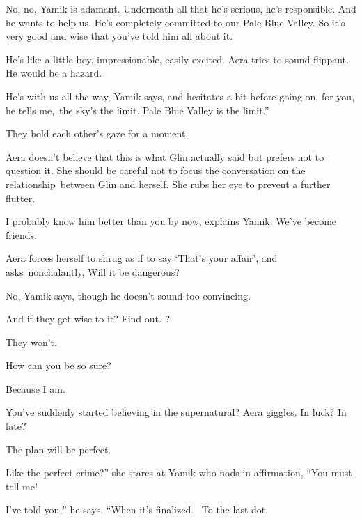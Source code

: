 \documentclass[letterpaper]{article}
\begin{document}
{\textquotedbl}No, no,{\textquotedbl} Yamik is adamant. {\textquotedbl}Underneath all that he's serious, he's
responsible. And he wants to help us. He's completely committed to our Pale Blue Valley. So it's very good and wise
that you've told him all about it.{\textquotedbl} 

{\textquotedbl}He's like a little boy, impressionable, easily excited.{\textquotedbl} Aera tries to sound flippant.
{\textquotedbl}He would be a hazard.{\textquotedbl}

{\textquotedbl}He's with us all the way,{\textquotedbl} Yamik says, and hesitates a bit before going on,\textcolor{red}{
}{\textquotedbl}for you, he tells me,~the sky's the limit. Pale Blue Valley is the limit.''

They hold each other's gaze for a moment.

Aera doesn't believe that this is what Glin actually said but prefers not to question it. She should be careful not to
focus the conversation on the relationship~between Glin and herself. She rubs her eye to prevent a further flutter.

{\textquotedbl}I probably know him better than you by now,{\textquotedbl} explains Yamik. {\textquotedbl}We've become
friends.{\textquotedbl} 

Aera forces herself to shrug as if to say `That's your affair', and asks~nonchalantly, {\textquotedbl}Will it be
dangerous?{\textquotedbl} 

{\textquotedbl}No,{\textquotedbl} Yamik says, though he doesn't sound too convincing. 

{\textquotedbl}And if they get wise\textcolor{red}{ }to it? Find out{\dots}?{\textquotedbl} 

{\textquotedbl}They won't.{\textquotedbl} \ 

{\textquotedbl}How can you be so sure?{\textquotedbl} 

{\textquotedbl}Because I am.{\textquotedbl} 

{\textquotedbl}You've suddenly started believing in the supernatural?{\textquotedbl} Aera giggles. {\textquotedbl}In
luck? In fate?{\textquotedbl} 

{\textquotedbl}The plan will be perfect.{\textquotedbl} 

{\textquotedbl}Like the perfect crime?'' she stares at Yamik who nods in affirmation, ``You must tell me!{\textquotedbl}


{\textquotedbl}I've told you,'' he says. ``When it's finalized.~ To the last dot.{\textquotedbl} 
\end{document}
